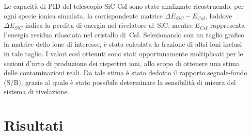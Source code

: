 \documentclass[10pt,foldmark,notumble]{leaflet}
\newcommand{\geant}{Geant4}
\begin{document}

Le capacità di PID del telescopio SiC-CsI sono state analizzate ricostruendo, per ogni specie ionica simulata, la corrispondente matrice $\Delta E_{SiC} - E_{CsI}$, laddove $\Delta E_{SiC}$ indica la perdita di energia nel rivelatore al~SiC, mentre $E_{CsI}$ rappresenta l'energia residua rilasciata nel cristallo di~CsI.
Selezionando con un taglio grafico la matrice dello ione di interesse, è stata calcolata la frazione di altri ioni inclusi in tale taglio.
I valori così ottenuti sono stati opportunamente moltiplicati per le sezioni d'urto di produzione dei rispettivi ioni, allo scopo di ottenere una stima delle contaminazioni reali.
Da tale stima è stato dedotto il rapporto segnale-fondo (S/B), grazie al quale è stato possibile determinare la sensibilità di misura del sistema di rivelazione.





\section{Risultati}
\end{document}
